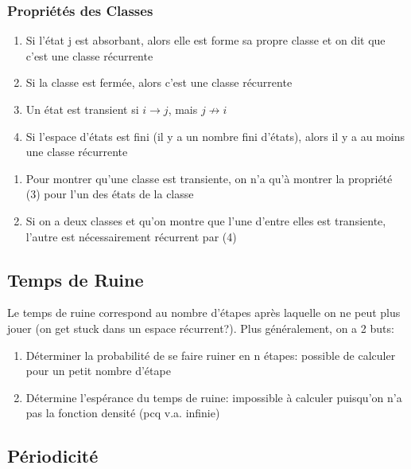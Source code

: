 \documentclass{article}
\begin{document}
\subsubsection{Propriétés des Classes}%
\label{ssub:Propriétés des Classes}

\begin{enumerate}
    \item Si l'état j est absorbant, alors elle est forme sa propre classe
	et on dit que c'est une classe récurrente
    \item Si la classe est fermée, alors c'est une classe récurrente
    \item Un état est transient si $ i \to j$, mais $ j \not\to i$
    \item Si l'espace d'états est fini (il y a un nombre fini d'états),
	alors il y a au moins une classe récurrente
\end{enumerate}

\begin{remark}
    \begin{enumerate}
	\item Pour montrer qu'une classe est transiente, on n'a qu'à montrer
	    la propriété (3) pour l'un des états de la classe
        \item Si on a deux classes et qu'on montre que l'une d'entre elles
	    est transiente, l'autre est nécessairement récurrent par (4)
    \end{enumerate}
\end{remark}

\subsection{Temps de Ruine}

Le temps de ruine correspond au nombre d'étapes après laquelle on ne peut
plus jouer (on get stuck dans un espace récurrent?). Plus généralement,
on a 2 buts:
\begin{enumerate}
    \item Déterminer la probabilité de se faire ruiner en n étapes:
	possible de calculer pour un petit nombre d'étape
    \item Détermine l'espérance du temps de ruine: impossible à calculer
	puisqu'on n'a pas la fonction densité (pcq v.a. infinie)
\end{enumerate}

\subsection{Périodicité}
\end{document}
